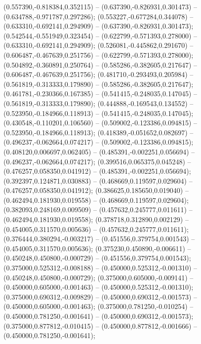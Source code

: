  (0.557390,-0.818384,0.352115) -- (0.637390,-0.826931,0.301473) -- (0.634788,-0.971787,0.297286);
 (0.553227,-0.677284,0.344078) -- (0.633310,-0.692141,0.294909) -- (0.637390,-0.826931,0.301473);
 (0.542544,-0.551949,0.323454) -- (0.622799,-0.571393,0.278000) -- (0.633310,-0.692141,0.294909);
 (0.526081,-0.445862,0.291670) -- (0.606487,-0.467639,0.251756) -- (0.622799,-0.571393,0.278000);
 (0.504892,-0.360891,0.250764) -- (0.585286,-0.382605,0.217647) -- (0.606487,-0.467639,0.251756);
 (0.481710,-0.293493,0.205984) -- (0.561819,-0.313333,0.179890) -- (0.585286,-0.382605,0.217647);
 (0.461781,-0.230366,0.167385) -- (0.541415,-0.248035,0.147045) -- (0.561819,-0.313333,0.179890);
 (0.444888,-0.169543,0.134552) -- (0.523950,-0.184966,0.118913) -- (0.541415,-0.248035,0.147045);
 (0.430548,-0.110201,0.106560) -- (0.509002,-0.123386,0.094815) -- (0.523950,-0.184966,0.118913);
 (0.418389,-0.051652,0.082697) -- (0.496237,-0.062664,0.074217) -- (0.509002,-0.123386,0.094815);
 (0.408120,0.006697,0.062405) -- (0.485391,-0.002251,0.056694) -- (0.496237,-0.062664,0.074217);
 (0.399516,0.065375,0.045248) -- (0.476257,0.058350,0.041912) -- (0.485391,-0.002251,0.056694);
 (0.392397,0.124871,0.030883) -- (0.468669,0.119597,0.029604) -- (0.476257,0.058350,0.041912);
 (0.386625,0.185650,0.019040) -- (0.462494,0.181930,0.019558) -- (0.468669,0.119597,0.029604);
 (0.382093,0.248169,0.009509) -- (0.457632,0.245777,0.011611) -- (0.462494,0.181930,0.019558);
 (0.378718,0.312890,0.002129) -- (0.454005,0.311570,0.005636) -- (0.457632,0.245777,0.011611);
 (0.376444,0.380294,-0.003217) -- (0.451556,0.379754,0.001543) -- (0.454005,0.311570,0.005636);
 (0.375230,0.450890,-0.006611) -- (0.450248,0.450800,-0.000729) -- (0.451556,0.379754,0.001543);
 (0.375000,0.525312,-0.008188) -- (0.450000,0.525312,-0.001310) -- (0.450248,0.450800,-0.000729);
 (0.375000,0.605000,-0.009141) -- (0.450000,0.605000,-0.001463) -- (0.450000,0.525312,-0.001310);
 (0.375000,0.690312,-0.009829) -- (0.450000,0.690312,-0.001573) -- (0.450000,0.605000,-0.001463);
 (0.375000,0.781250,-0.010254) -- (0.450000,0.781250,-0.001641) -- (0.450000,0.690312,-0.001573);
 (0.375000,0.877812,-0.010415) -- (0.450000,0.877812,-0.001666) -- (0.450000,0.781250,-0.001641);
